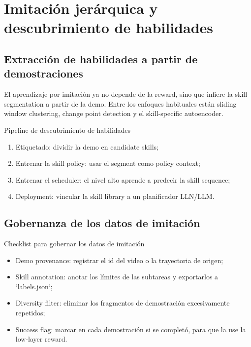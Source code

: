 \section{Imitación jerárquica y descubrimiento de habilidades}

\subsection{Extracción de habilidades a partir de demostraciones}

El aprendizaje por imitación ya no depende de la reward, sino que infiere la skill segmentation a partir de la demo. Entre los enfoques habituales están sliding window clustering, change point detection y el skill-specific autoencoder.

\begin{importantbox}{Pipeline de descubrimiento de habilidades}
\begin{enumerate}
    \item Etiquetado: dividir la demo en candidate skills;
    \item Entrenar la skill policy: usar el segment como policy context;
    \item Entrenar el scheduler: el nivel alto aprende a predecir la skill sequence;
    \item Deployment: vincular la skill library a un planificador LLN/LLM.
\end{enumerate}
\end{importantbox}

\subsection{Gobernanza de los datos de imitación}

\begin{knowledgebox}{Checklist para gobernar los datos de imitación}
\begin{itemize}
    \item Demo provenance: registrar el id del video o la trayectoria de origen;
    \item Skill annotation: anotar los límites de las subtareas y exportarlos a `labels.json`;
    \item Diversity filter: eliminar los fragmentos de demostración excesivamente repetidos;
    \item Success flag: marcar en cada demostración si se completó, para que la use la low-layer reward.
\end{itemize}
\end{knowledgebox}

